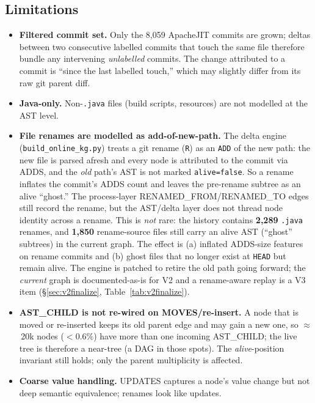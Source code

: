 \documentclass[11pt,a4paper]{article}
\newcommand{\code}[1]{\texttt{#1}}
\newcommand{\edge}[1]{\textsc{#1}}
\begin{document}
	\subsection*{Limitations}
	\begin{itemize}[nosep]
		\item \textbf{Filtered commit set.} Only the 8{,}059 ApacheJIT commits are
		grown; deltas between two consecutive labelled commits that touch the
		same file therefore bundle any intervening \emph{unlabelled} commits.
		The change attributed to a commit is ``since the last labelled touch,''
		which may slightly differ from its raw git parent diff.
		\item \textbf{Java-only.} Non-\texttt{.java} files (build scripts, resources)
		are not modelled at the AST level.
		\item \textbf{File renames are modelled as add-of-new-path.} The delta engine
		(\texttt{build\_online\_kg.py}) treats a git rename (\code{R}) as an
		\code{ADD} of the new path: the new file is parsed afresh and every node is
		attributed to the commit via \edge{ADDS}, and the \emph{old} path's AST is
		not marked \code{alive=false}. So a rename inflates the commit's \edge{ADDS}
		count and leaves the pre-rename subtree as an alive ``ghost.'' The
		process-layer \edge{RENAMED\_FROM}/\edge{RENAMED\_TO} edges still record the
		rename, but the AST/delta layer does not thread node identity across a rename.
		This is \emph{not} rare: the history contains \textbf{2{,}289} \texttt{.java}
		renames, and \textbf{1{,}850} rename-source files still carry an alive AST
		(``ghost'' subtrees) in the current graph. The effect is (a) inflated
		\edge{ADDS}-size features on rename commits and (b) ghost files that no longer
		exist at \texttt{HEAD} but remain alive. The engine is patched to retire the
		old path going forward; the \emph{current} graph is documented-as-is for V2
		and a rename-aware replay is a V3 item (\S\ref{sec:v2finalize},
		Table~\ref{tab:v2finalize}).
		\item \textbf{\edge{AST\_CHILD} is not re-wired on \edge{MOVES}/re-insert.} A
		node that is moved or re-inserted keeps its old parent edge and may gain a new
		one, so $\approx$\,20k nodes ($<0.6\%$) have more than one incoming
		\edge{AST\_CHILD}; the live tree is therefore a near-tree (a DAG in those
		spots). The \emph{alive}-position invariant still holds; only the parent
		multiplicity is affected.
		\item \textbf{Coarse value handling.} \edge{UPDATES} captures a node's value
		change but not deep semantic equivalence; renames look like updates.

\end{itemize}
\end{document}
